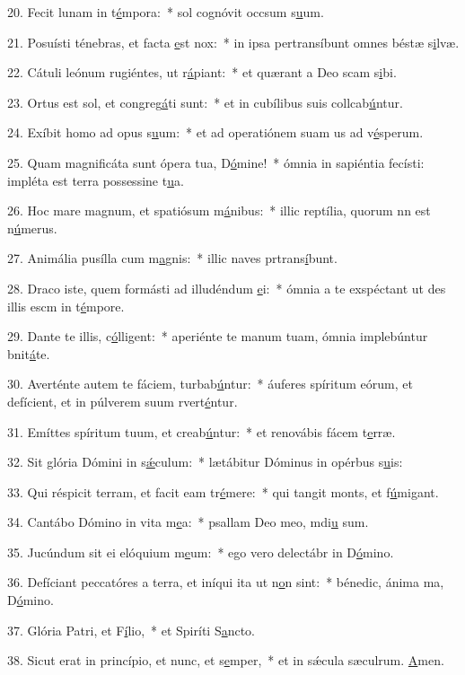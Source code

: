 20. Fecit lunam in t\uline{é}mpora:~* sol cognóvit occsum s\uline{u}um.\par 
21. Posuísti ténebras, et facta \uline{e}st nox:~* in ipsa pertransíbunt omnes béstæ s\uline{i}lvæ.\par 
22. Cátuli leónum rugiéntes, ut r\uline{á}piant:~* et quærant a Deo scam s\uline{i}bi.\par 
23. Ortus est sol, et congreg\uline{á}ti sunt:~* et in cubílibus suis collcab\uline{ú}ntur.\par 
24. Exíbit homo ad opus s\uline{u}um:~* et ad operatiónem suam us ad v\uline{é}sperum.\par 
25. Quam magnificáta sunt ópera tua, D\uline{ó}mine!~* ómnia in sapiéntia fecísti: impléta est terra possessine t\uline{u}a.\par 
26. Hoc mare magnum, et spatiósum m\uline{á}nibus:~* illic reptília, quorum nn est n\uline{ú}merus.\par 
27. Animália pusílla cum m\uline{a}gnis:~* illic naves prtrans\uline{í}bunt.\par 
28. Draco iste, quem formásti ad illudéndum \uline{e}i:~* ómnia a te exspéctant ut des illis escm in t\uline{é}mpore.\par 
29. Dante te illis, c\uline{ó}lligent:~* aperiénte te manum tuam, ómnia implebúntur bnit\uline{á}te.\par 
30. Averténte autem te fáciem, turbab\uline{ú}ntur:~* áuferes spíritum eórum, et defícient, et in púlverem suum rvert\uline{é}ntur.\par 
31. Emíttes spíritum tuum, et creab\uline{ú}ntur:~* et renovábis fácem t\uline{e}rræ.\par 
32. Sit glória Dómini in s\uline{ǽ}culum:~* lætábitur Dóminus in opérbus s\uline{u}is:\par 
33. Qui réspicit terram, et facit eam tr\uline{é}mere:~* qui tangit monts, et f\uline{ú}migant.\par 
34. Cantábo Dómino in vita m\uline{e}a:~* psallam Deo meo, mdi\uline{u} sum.\par 
35. Jucúndum sit ei elóquium m\uline{e}um:~* ego vero delectábr in D\uline{ó}mino.\par 
36. Defíciant peccatóres a terra, et iníqui ita ut n\uline{o}n sint:~* bénedic, ánima ma, D\uline{ó}mino.\par 
37. Glória Patri, et F\uline{í}lio,~* et Spiríti S\uline{a}ncto.\par 
38. Sicut erat in princípio, et nunc, et s\uline{e}mper,~* et in sǽcula sæculrum. \uline{A}men.\par 
